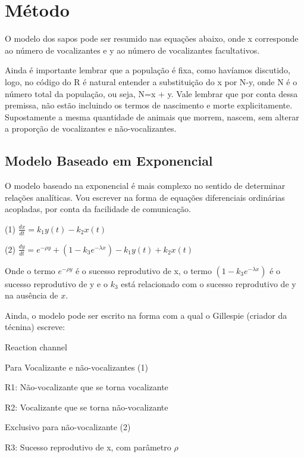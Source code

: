 \section{Método}\label{Metodo}
O modelo dos sapos pode ser resumido nas equações abaixo, onde x corresponde ao número de vocalizantes e y ao número de vocalizantes facultativos.

Ainda é importante lembrar que a população é fixa, como havíamos discutido, logo, no código do R é natural entender a substituição do x por N-y, onde N é o número total da população, ou seja, N=x + y. Vale lembrar que por conta dessa premissa, não estão incluindo os termos de nascimento e morte explicitamente. Supostamente a mesma quantidade de animais que morrem, nascem, sem alterar a proporção de vocalizantes e não-vocalizantes.

\subsection{Modelo Baseado em Exponencial}
O modelo baseado na exponencial é mais complexo no sentido de determinar relações analíticas. Vou escrever na forma de equações diferenciais ordinárias acopladas, por conta da facilidade de comunicação.

\vspace{3 mm}
(1) $\frac{dx}{dt} = k_1 y(t) -k_2 x(t)$

\vspace{3 mm}
(2) $\frac{dy}{dt}= e^{-\rho y} + (1-k_3 e^{-\lambda x}) -k_1 y(t) +k_2 x(t)$
\vspace{3 mm}

Onde o termo $e^{-\rho y}$ é o sucesso reprodutivo de x, o termo $(1-k_3 e^{-\lambda x})$ é o sucesso reprodutivo de y e o $k_3$ está relacionado com o sucesso reprodutivo de y na ausência de $x$.

Ainda, o modelo pode ser escrito na forma com a qual o Gillespie (criador da técnina) escreve:

\vspace{3 mm}
Reaction channel
\vspace{3 mm}

Para Vocalizante e não-vocalizantes (1)

R1: Não-vocalizante que se torna vocalizante

R2: Vocalizante que se torna não-vocalizante

\vspace{3 mm}
Exclusivo para não-vocalizante (2)

R3: Sucesso reprodutivo de x, com parâmetro $\rho$

